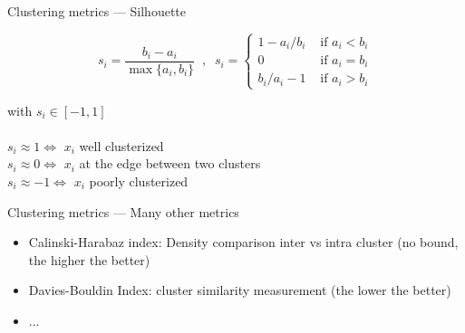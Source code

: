 \begin{frame}{Clustering metrics --- Silhouette}
  
  \begin{center}
    \[
    s_i = \frac{b_i - a_i}{\max\{a_i, b_i\}}\;\;,\;\;
    s_i = \left\{
    \begin{array}{ll}
      1 - a_i/b_i & \mbox{ if } a_i < b_i \\[2mm]
      0 & \mbox{ if } a_i = b_i \\[2mm]
      b_i / a_i - 1 & \mbox{ if } a_i > b_i
    \end{array}\right.
    \]
    
  \end{center}
  with $s_i \in [-1, 1]$ \\
  \\
  $s_i \approx 1 \iff$ $x_i$ well clusterized \\
  $s_i \approx 0 \iff$ $x_i$ at the edge between two clusters\\
  $s_i \approx -1 \iff$ $x_i$ poorly clusterized
\end{frame}

\begin{frame}{Clustering metrics --- Many other metrics}
  \begin{itemize}
  \item Calinski-Harabaz index: Density comparison inter vs intra cluster (no bound, the higher the better)
  \item Davies-Bouldin Index: cluster similarity measurement (the lower the better)
  \item ...
  \end{itemize}
\end{frame}
